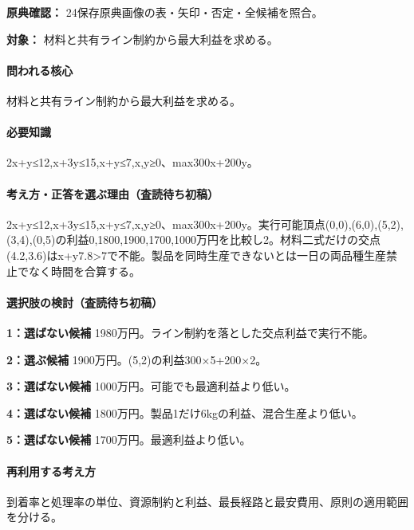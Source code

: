 \noindent\textbf{原典確認：} 24保存原典画像の表・矢印・否定・全候補を照合。\par

\noindent\textbf{対象：} 材料と共有ライン制約から最大利益を求める。\par

\paragraph{問われる核心} 材料と共有ライン制約から最大利益を求める。

\paragraph{必要知識} 2x+y≤12,x+3y≤15,x+y≤7,x,y≥0、max300x+200y。

\paragraph{考え方・正答を選ぶ理由（査読待ち初稿）} 2x+y≤12,x+3y≤15,x+y≤7,x,y≥0、max300x+200y。実行可能頂点(0,0),(6,0),(5,2),(3,4),(0,5)の利益0,1800,1900,1700,1000万円を比較し2。材料二式だけの交点(4.2,3.6)はx+y7.8>7で不能。製品を同時生産できないとは一日の両品種生産禁止でなく時間を合算する。

\paragraph{選択肢の検討（査読待ち初稿）}\mbox{}\par

\noindent\textbf{1：選ばない候補} 1980万円。ライン制約を落とした交点利益で実行不能。\par

\noindent\textbf{2：選ぶ候補} 1900万円。(5,2)の利益300×5+200×2。\par

\noindent\textbf{3：選ばない候補} 1000万円。可能でも最適利益より低い。\par

\noindent\textbf{4：選ばない候補} 1800万円。製品1だけ6kgの利益、混合生産より低い。\par

\noindent\textbf{5：選ばない候補} 1700万円。最適利益より低い。\par

\paragraph{再利用する考え方} 到着率と処理率の単位、資源制約と利益、最長経路と最安費用、原則の適用範囲を分ける。

